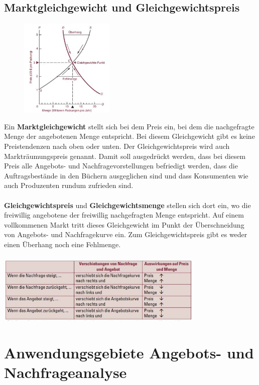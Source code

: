 \documentclass[10pt]{scrartcl}
\begin{document}
\subsection{Marktgleichgewicht und Gleichgewichtspreis}
\begin{figure}
  \begin{center}
    \includegraphics[width=0.4\textwidth]{img/angebot_nachfrage_1.jpg}
  \end{center}
\end{figure}
Ein {\bf Marktgleichgewicht} stellt sich bei dem Preis ein, bei dem die nachgefragte Menge der angebotenen Menge entspricht. Bei diesem Gleichgewicht gibt es keine Preistendenzen nach oben oder unten. Der Gleichgewichtspreis wird auch Markträumungspreis genannt. Damit soll ausgedrückt werden, dass bei diesem Preis alle Angebots- und Nachfragevorstellungen befriedigt werden, dass die Auftragsbestände in den Büchern ausgeglichen sind und dass Konsumenten wie auch Produzenten rundum zufrieden sind.
\\
\\
{\bf Gleichgewichtspreis} und {\bf Gleichgewichtsmenge }stellen sich dort ein, wo die freiwillig angebotene der freiwillig nachgefragten Menge entspricht. Auf einem vollkommenen Markt tritt dieses Gleichgewicht im Punkt der Überschneidung von Angebots- und Nachfragekurve ein. Zum Gleichgewichtspreis gibt es weder einen Überhang noch eine Fehlmenge.
\\
\\
\includegraphics[width=0.75\textwidth]{img/angebot_nachfrage_bewegungen.jpg}
\pagebreak
\section{Anwendungsgebiete Angebots- und Nachfrageanalyse}
\end{document}
